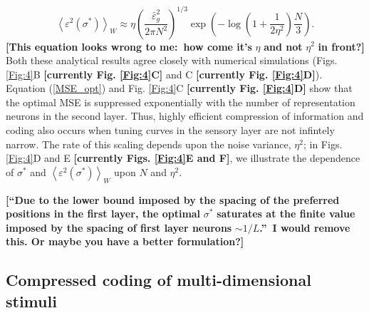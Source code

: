 \documentclass[a4paper]{article}%
\begin{document}
\begin{equation}
\left\langle \varepsilon^{2}(\sigma^{\ast})\right\rangle _{W}\approx
\eta\left(  \frac{\bar{\varepsilon}_{g}^{2}}{2\pi N^{2}}\right)  ^{1/3}%
\exp\left(  {-\log\left(  {1+\frac{1}{2\eta^{2}}}\right)  \frac{N}{3}}\right)
.\label{MSE_opt}%
\end{equation}
\textbf{[This equation looks wrong to me:\ how come it's }$\eta$\textbf{ and
not }$\eta^{2}$\textbf{ in front?]} Both these analytical results agree
closely with numerical simulations (Figs. \ref{Fig:4}B \textbf{[currently Fig.
\ref{Fig:4}C] }and C \textbf{[currently Fig. \ref{Fig:4}D]}). Equation
(\ref{MSE_opt}) and Fig. \ref{Fig:4}C \textbf{[currently Fig. \ref{Fig:4}D]}
show that the optimal MSE is suppressed exponentially with the number of
representation neurons in the second layer. Thus, highly efficient compression
of information and coding also occurs when tuning curves in the sensory layer
are not infintely narrow. The rate of this scaling depends upon the noise
variance, $\eta^{2}$; in Figs. \ref{Fig:4}D and E \textbf{[currently Figs.
\ref{Fig:4}E and F]}, we illustrate the dependence of $\sigma^{\ast}$ and
$\left\langle \varepsilon^{2}(\sigma^{\ast})\right\rangle _{W}$ upon $N$ and
$\eta^{2}$.

\textbf{[\textquotedblleft Due to the lower bound imposed by the spacing of
the preferred positions in the first layer, the optimal }$\sigma^{\ast}%
$\textbf{ saturates at the finite value imposed by the spacing of first layer
neurons }$\sim1/L$\textbf{.\textquotedblright\ I would remove this. Or maybe
you have a better formulation?]}

\subsection{Compressed coding of multi-dimensional stimuli}
\end{document}
